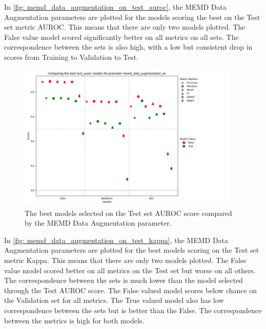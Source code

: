 In \autoref{fig: memd_data_augmentation_on_test_auroc}, the MEMD Data Augmentation parameters are plotted for the models scoring the best on the Test set metric AUROC. This means that there are only two models plotted. The False value model scored significantly better on all metrics on all sets. The correspondence between the sets is also high, with a low but consistent drop in scores from Training to Validation to Test.


\begin{figure}[H]
    \centering
    \includegraphics[width=400px]{Figures/results/memd_data_augmentation_on/memd_data_augmentation_on_test_auroc.png}
    \caption{The best models selected on the Test set AUROC score compared by the MEMD Data Augmentation parameter.}
    \label{fig: memd_data_augmentation_on_test_auroc}
\end{figure}

In \autoref{fig: memd_data_augmentation_on_test_kappa}, the MEMD Data Augmentation parameters are plotted for the best models scoring on the Test set metric Kappa. This means that there are only two models plotted. The False value model scored better on all metrics on the Test set but worse on all others. The correspondence between the sets is much lower than the model selected through the Test AUROC score. The False valued model scores below chance on the Validation set for all metrics. The True valued model also has low correspondence between the sets but is better than the False. The correspondence between the metrics is high for both models.

